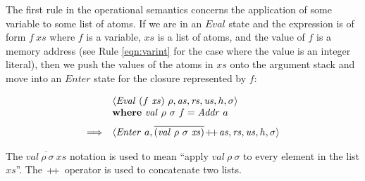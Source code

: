 The first rule in the operational semantics concerns the application of some variable to some list of atoms. If we are in an $\mathit{Eval}$ state and the expression is of form $\mathit{f}~\mathit{xs}$ where $f$ is a variable, $\mathit{xs}$ is a list of atoms, and the value of $f$ is a memory address (see Rule \ref{eqn:varint} for the case where the value is an integer literal), then we push the values of the atoms in $\mathit{xs}$ onto the argument stack and move into an $\mathit{Enter}$ state for the closure represented by $f$:
\begin{mdframed}
\begin{equation}
\begin{array}{cl}
 & \langle \mathit{Eval}~(f~\mathit{xs})~\rho, \mathit{as}, \mathit{rs}, \mathit{us}, h, \sigma \rangle \\
 & \mathbf{where}~\mathit{val}~\rho~\sigma~f = \mathit{Addr}~a\\[0.25cm]
\Longrightarrow & \langle \mathit{Enter}~a, \overline{(\mathit{val}~\rho~\sigma~\mathit{xs})} \append \mathit{as}, \mathit{rs}, \mathit{us}, h, \sigma \rangle
\end{array}
\end{equation}
\end{mdframed}
The $\overline{\mathit{val}~\rho~\sigma~\mathit{xs}}$ notation is used to mean ``apply $\mathit{val}~\rho~\sigma$ to every element in the list $\mathit{xs}$''. The $\append$ operator is used to concatenate two lists.

